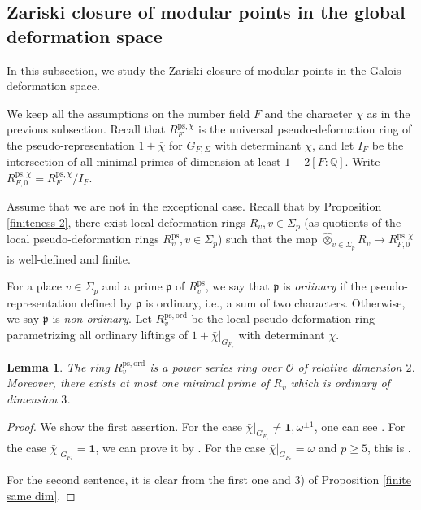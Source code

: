 \documentclass[a4paper, 12pt]{amsart}
\newtheorem{lem}[thm]{Lemma}
\def\ps{\mathrm{ps}}
\def\ord{\mathrm{ord}}
\newcommand{\Q}{\mathbb{Q}}
\newcommand{\cO}{\mathcal{O}}
\newcommand{\kp}{\mathfrak{p}}
\begin{document}
        \subsection{Zariski closure of modular points in the global deformation space}\label{5.3} In this subsection, we study the Zariski closure of modular points in the Galois deformation space.
        
        We keep all the assumptions on the number field $F$ and the character $\chi$ as in the previous subsection. Recall that $R_{F}^{\ps, \chi}$ is the universal pseudo-deformation ring of the pseudo-representation $1+\bar{\chi}$ for $G_{F, \Sigma}$ with determinant $\chi$, and let $I_{F}$ be the intersection of all minimal primes of dimension at least $1+2[F:\Q]$. Write $ R_{F, 0}^{\ps, \chi}= R_{F}^{\ps, \chi}/I_{F}$.
        
        Assume that we are not in the exceptional case. Recall that by Proposition \ref{finiteness 2}, there exist local deformation rings $R_v, v \in \Sigma_p$ (as quotients of the local pseudo-deformation rings $R_v^\ps, v \in \Sigma_p$) such that the map $\widehat{\otimes}_{v \in \Sigma_p} R_{v} \to R_{F, 0}^{\ps, \chi} $ is well-defined and finite.
        
        For a place $v \in \Sigma_p$ and a prime $\kp$ of $R_v^\ps$, we say that $\kp$ is \textit{ordinary} if the pseudo-representation defined by $\kp $ is ordinary, i.e., a sum of two characters. Otherwise, we say $\kp$ is \textit{non-ordinary}. Let $R_v^{\ps, \ord}$ be the local pseudo-deformation ring parametrizing all ordinary liftings of $1+\bar{\chi}|_{G_{F_v}}$ with determinant $\chi$.
        
        \begin{lem}\label{dim of v ord}
        	The ring $R_v^{\ps, \ord}$ is a power series ring over $\cO$ of relative dimension $2$. Moreover, there exists at most one minimal prime of $R_v$ which is ordinary of dimension $3$.
        \end{lem}
    
    \begin{proof}
    	We show the first assertion. For the case $\bar{\chi}|_{G_{F_v}} \ne \mathbf{1}, \omega^{\pm 1}$, one can see \cite[Remark B.28]{Pa_k_nas_2013}. For the case $\bar{\chi}|_{G_{F_v}} = \mathbf{1}$, we can prove it by \cite[Proposition 9.12 \& Corollary 9.13]{Pa_k_nas_2013}. For the case $\bar{\chi}|_{G_{F_v}}= \omega $ and $p \ge 5$, this is \cite[Corollary B.6]{Pa_k_nas_2013}.
    	
    	For the second sentence, it is clear from the first one and 3) of Proposition \ref{finite same dim}.
    \end{proof}
    
\end{document}
